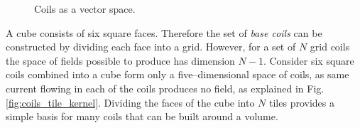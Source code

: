 \begin{figure}[bth]
  \myfloatalign
  \quad
  \caption{Coils as a vector space.}
\end{figure}

A cube consists of six square faces. Therefore the set of \emph{base coils} can be constructed by dividing each face into a grid. However, for a set of $N$ grid coils the space of fields possible to produce has dimension $N-1$. Consider six square coils combined into a cube form only a five--dimensional space of coils, as same current flowing in each of the coils produces no field, as explained in Fig.\,\ref{fig:coils_tile_kernel}. Dividing the faces of the cube into $N$ tiles provides a simple basis for many coils that can be built around a volume.


